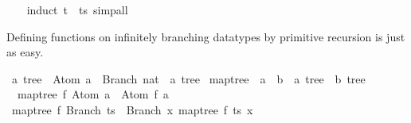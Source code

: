 \begin{isabellebody}
%
\isadelimproof
\ \ %
\endisadelimproof
%
\isatagproof
{}\isamarkupfalse%
\ {}induct\ t\ \ ts{}\ simp{}all%
\endisatagproof
{\isafoldproof}%
%
\isadelimproof
%
\endisadelimproof
%
\isamarkuptrue%
%
\begin{isamarkuptext}%
Defining functions on infinitely branching datatypes by
  primitive recursion is just as easy.%
\end{isamarkuptext}%
\isamarkuptrue%
\isamarkupfalse%
\ {}a\ tree\ {}\ Atom\ {}a\ {}\ Branch\ {}nat\ {}\ {}a\ tree{}\isanewline
\isanewline
{}\isamarkupfalse%
\ map{}tree\ {}{}\ {}{}{}a\ {}\ {}b{}\ {}\ {}a\ tree\ {}\ {}b\ tree{}\isanewline
{}\isanewline
\ \ {}map{}tree\ f\ {}Atom\ a{}\ {}\ Atom\ {}f\ a{}{}\isanewline
{}\ {}map{}tree\ f\ {}Branch\ ts{}\ {}\ Branch\ {}{}x{}\ map{}tree\ f\ {}ts\ x{}{}{}%

\end{isabellebody}
